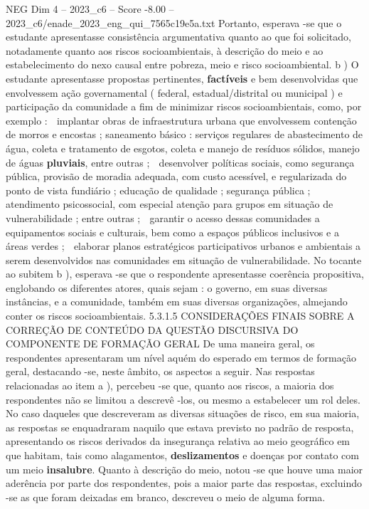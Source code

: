 \begin{textsample}{NEG Dim 4 – 2023\_c6 – Score -8.00 – 2023\_c6/enade\_2023\_eng\_qui\_7565c19e5a.txt}
Portanto, esperava -se que o estudante apresentasse consistência argumentativa quanto ao que foi solicitado, notadamente quanto aos riscos socioambientais, à descrição do meio e ao estabelecimento do nexo causal entre pobreza, meio e risco socioambiental. b ) O estudante apresentasse propostas pertinentes, \textbf{factíveis} e bem desenvolvidas que envolvessem ação governamental ( federal, estadual/distrital ou municipal ) e participação da comunidade a fim de minimizar riscos socioambientais, como, por exemplo :  implantar obras de infraestrutura urbana que envolvessem contenção de morros e encostas ; saneamento básico : serviços regulares de abastecimento de água, coleta e tratamento de esgotos, coleta e manejo de resíduos sólidos, manejo de águas \textbf{pluviais}, entre outras ;  desenvolver políticas sociais, como segurança pública, provisão de moradia adequada, com custo acessível, e regularizada do ponto de vista fundiário ; educação de qualidade ; segurança pública ; atendimento psicossocial, com especial atenção para grupos em situação de vulnerabilidade ; entre outras ;  garantir o acesso dessas comunidades a equipamentos sociais e culturais, bem como a espaços públicos inclusivos e a áreas verdes ;  elaborar planos estratégicos participativos urbanos e ambientais a serem desenvolvidos nas comunidades em situação de vulnerabilidade.
No tocante ao subitem b ), esperava -se que o respondente apresentasse coerência propositiva, englobando os diferentes atores, quais sejam : o governo, em suas diversas instâncias, e a comunidade, também em suas diversas organizações, almejando conter os riscos socioambientais. 5.3.1.5 CONSIDERAÇÕES FINAIS SOBRE A CORREÇÃO DE CONTEÚDO DA QUESTÃO DISCURSIVA DO COMPONENTE DE FORMAÇÃO GERAL De uma maneira geral, os respondentes apresentaram um nível aquém do esperado em termos de formação geral, destacando -se, neste âmbito, os aspectos a seguir.
Nas respostas relacionadas ao item a ), percebeu -se que, quanto aos riscos, a maioria dos respondentes não se limitou a descrevê -los, ou mesmo a estabelecer um rol deles.
No caso daqueles que descreveram as diversas situações de risco, em sua maioria, as respostas se enquadraram naquilo que estava previsto no padrão de resposta, apresentando os riscos derivados da insegurança relativa ao meio geográfico em que habitam, tais como alagamentos, \textbf{deslizamentos} e doenças por contato com um meio \textbf{insalubre}.
Quanto à descrição do meio, notou -se que houve uma maior aderência por parte dos respondentes, pois a maior parte das respostas, excluindo -se as que foram deixadas em branco, descreveu o meio de alguma forma.

\end{textsample}
